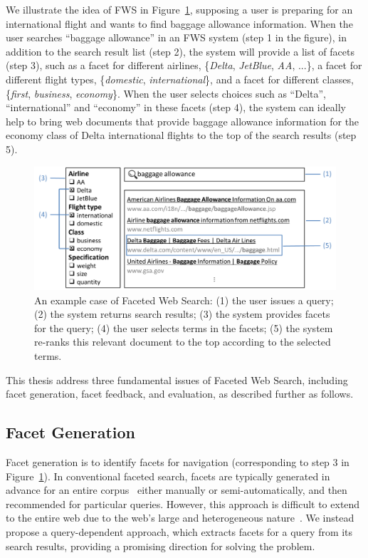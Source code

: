 We illustrate the idea of FWS in Figure~\ref{fig:fws-example}, supposing a user is preparing for an international flight and wants to find baggage allowance information. When the user searches ``baggage allowance'' in an FWS system (step 1 in the figure), in addition to the search result list (step 2), the system will provide a list of facets (step 3), such as a facet for different airlines, \{\textit{Delta}, \textit{JetBlue}, \textit{AA}, ...\}, a facet for different flight types, \{\textit{domestic}, \textit{international}\}, and a facet for different classes, \{\textit{first}, \textit{business}, \textit{economy}\}. When the user selects choices such as ``Delta'', ``international'' and ``economy'' in these facets (step 4), the system can ideally help to bring web documents that provide 
baggage allowance information for the economy class of Delta international flights to the top of the search results (step 5).
\begin{figure}[ht!]
\centering
\includegraphics[width=0.95\columnwidth]{figure/fws-example.png}
\caption{An example case of Faceted Web Search: (1) the user issues a query; (2) the system returns search results; (3) the system provides facets for the query; (4) the user selects terms in the facets; (5) the system re-ranks this relevant document to the top according to the selected terms.}
\label{fig:fws-example}
\end{figure}


This thesis address three fundamental issues of Faceted Web Search, including facet generation, facet feedback, and evaluation, as described further as follows.

\subsection{Facet Generation}
Facet generation is to identify facets for navigation (corresponding to step 3 in Figure~\ref{fig:fws-example}). In conventional faceted search, facets are typically generated in advance for an entire corpus~\cite{stoica2007automating,dakka2008automatic} either manually or semi-automatically, and then recommended for particular queries. However, this approach is difficult to extend to the entire web due to the web's large and heterogeneous nature~\cite{teevan2008challenges}. We instead propose a query-dependent approach, which extracts facets for a query from its search results, providing a promising direction for solving the problem. 

